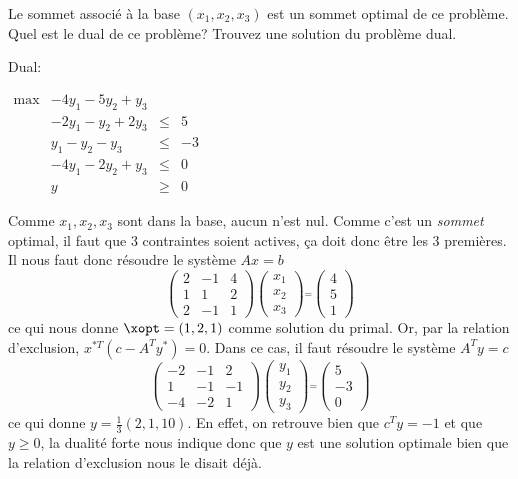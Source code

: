 \begin{enumerate}
    Le sommet associé à la base $(x_1, x_2, x_3)$ est un sommet optimal de ce problème. Quel est le dual de ce problème? Trouvez une solution du problème dual.


    \begin{solution}
      Dual:

      $
      \begin{array}{llcr}
        \max & -4y_{1} - 5y_{2} + y_{3}\\
        & -2y_{1} - y_{2}  + 2y_{3} & \leq & 5\\
        & y_{1} - y_{2}  -y_{3} & \leq & -3\\
        & -4y_{1} - 2y_{2}  + y_{3} & \leq & 0\\
        & y & \geq & 0
      \end{array}
      $

      Comme $x_1, x_2, x_3$ sont dans la base, aucun n'est nul.
      Comme c'est un \emph{sommet} optimal, il faut que 3 contraintes
      soient actives, ça doit donc être les 3 premières.
      Il nous faut donc résoudre le système $Ax = b$
      \[
        \begin{pmatrix}
          2 & -1 & 4\\
          1 & 1 & 2\\
          2 & -1 & 1
        \end{pmatrix}
        \begin{pmatrix}
          x_{1}\\
          x_{2}\\
          x_{3}
        \end{pmatrix}
        \stackrel{=}{}
        \begin{pmatrix}
          4\\
          5\\
          1
        \end{pmatrix}
      \]
      ce qui nous donne
      $\xopt = (1,2,1)$ comme solution du primal.
      Or, par la relation d'exclusion, $x^{*T}(c -A^{T}y^*) = 0$.
      Dans ce cas, il faut résoudre le système $A^Ty = c$
      \[
        \begin{pmatrix}
          -2 & -1 & 2\\
          1 & -1 & -1\\
          -4 & -2 & 1
        \end{pmatrix}
        \begin{pmatrix}
          y_{1}\\
          y_{2}\\
          y_{3}
        \end{pmatrix}
        \stackrel{=}{}
        \begin{pmatrix}
          5\\
          -3\\
          0
        \end{pmatrix}
      \]
      ce qui donne $y = \frac{1}{3}(2, 1, 10)$.
      En effet, on retrouve bien que $c^T y = -1$ et que $y \geq 0$,
      la dualité forte nous indique donc que $y$ est une solution optimale
      bien que la relation d'exclusion nous le disait déjà.
    \end{solution}


\end{enumerate}
